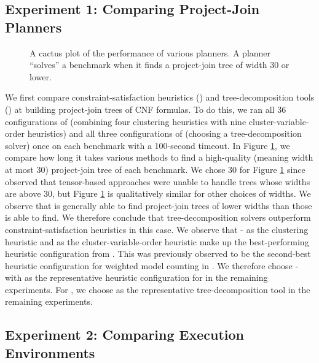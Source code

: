 \subsection{Experiment 1: Comparing Project-Join Planners}
\label{sec_experiments_planning}

\begin{figure}[t]
	\centering
	
    \vspace*{-1cm}
	\caption{\label{fig:planning} A cactus plot of the performance of various planners.
	A planner ``solves'' a benchmark when it finds a project-join tree of width 30 or lower.}
\end{figure}

We first compare constraint-satisfaction heuristics (\Htb) and tree-decomposition tools (\Lg) at building project-join trees of CNF formulas.
To do this, we ran all 36 configurations of \Htb{} (combining four clustering heuristics with nine cluster-variable-order heuristics) and all three configurations of \Lg{} (choosing a tree-decomposition solver) once on each benchmark with a 100-second timeout.
In Figure \ref{fig:planning}, we compare how long it takes various methods to find a high-quality (meaning width at most 30) project-join tree of each benchmark.
We chose 30 for Figure \ref{fig:planning} since \cite{dudek2019efficient} observed that tensor-based approaches were unable to handle trees whose widths are above 30, but Figure \ref{fig:planning} is qualitatively similar for other choices of widths.
We observe that \Lg{} is generally able to find project-join trees of lower widths than those \Htb{} is able to find.
We therefore conclude that tree-decomposition solvers outperform constraint-satisfaction heuristics in this case.
We observe that \Be-\TreeH{} as the clustering heuristic and \Invlexp{} as the cluster-variable-order heuristic make up the best-performing heuristic configuration from \Htb.
This was previously observed to be the second-best heuristic configuration for weighted model counting in \cite{dudek2020addmc}.
We therefore choose \Be-\TreeH{} with \Invlexp{} as the representative heuristic configuration for \Htb{} in the remaining experiments.
For \Lg{}, we choose \Flowcutter{} as the representative tree-decomposition tool in the remaining experiments.


\subsection{Experiment 2: Comparing Execution Environments}
\label{sec_experiments_execution}

